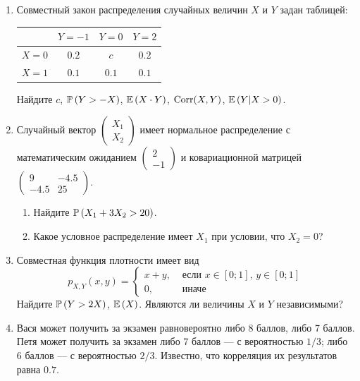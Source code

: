 \begin{enumerate}
\item Совместный закон распределения случайных величин  $X$  и  $Y$
задан таблицей:

\begin{center}
\begin{tabular}{@{}cccc@{}}
\toprule
    & $Y=-1$ & $Y=0$ & $Y=2$ \\ \midrule
$X=0$ & $0.2$  & $c$   & $0.2$ \\
$X=1$ & $0.1$  & $0.1$ & $0.1$ \\ \bottomrule
\end{tabular}
\end{center}

Найдите $c$, $\P\left(Y>-X\right)$, $\E\left(X\cdot Y \right)$, $\Corr(X,Y)$,
$\E\left(Y|X>0\right)$.

\item Случайный вектор  $\left(\begin{array}{c}
{X_{1} } \\ {X_{2} }
\end{array}\right)$  имеет нормальное распределение с
математическим ожиданием  $\left(\begin{array}{c} {2} \\ {-1}
\end{array}\right)$  и ковариационной матрицей
$\left(\begin{array}{cc} {9} & {-4.5} \\ {-4.5} & {25}
\end{array}\right)$.
\begin{enumerate}
\item Найдите  $\P\left(X_{1} +3X_{2} >20\right)$.
\item Какое условное распределение имеет $X_{1}$ при условии, что $X_{2}=0$?
\end{enumerate}

\item Совместная функция плотности имеет вид
\[
p_{X,Y} \left(x,y\right)=
\begin{cases}
x+y, & \text{ если } x\in \left[0;1\right],\, y\in \left[0;1\right] \\
0, & \text{ иначе}
\end{cases}
\]
Найдите  $\P\left(Y>2X\right)$, $\E\left(X\right)$. Являются ли величины $X$ и $Y$
независимыми?

\item Вася может получить за экзамен равновероятно либо 8 баллов, либо 7 баллов.
Петя может получить за экзамен либо 7 баллов — с вероятностью $1/3$; либо 6 баллов —
с вероятностью $2/3$. Известно, что корреляция их результатов равна $0.7$.


\end{enumerate}

